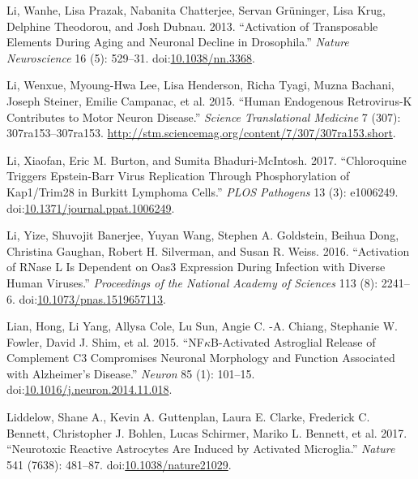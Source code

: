 \documentclass[onehalf,12pt]{beavtex}
\begin{document}
  \hypertarget{ref-LiActivationtransposableelements2013}{}
  Li, Wanhe, Lisa Prazak, Nabanita Chatterjee, Servan Grüninger, Lisa
  Krug, Delphine Theodorou, and Josh Dubnau. 2013. ``Activation of
  Transposable Elements During Aging and Neuronal Decline in Drosophila.''
  \emph{Nature Neuroscience} 16 (5): 529--31.
  doi:\href{https://doi.org/10.1038/nn.3368}{10.1038/nn.3368}.
  
  \hypertarget{ref-LiHumanendogenousretrovirusK2015a}{}
  Li, Wenxue, Myoung-Hwa Lee, Lisa Henderson, Richa Tyagi, Muzna Bachani,
  Joseph Steiner, Emilie Campanac, et al. 2015. ``Human Endogenous
  Retrovirus-K Contributes to Motor Neuron Disease.'' \emph{Science
  Translational Medicine} 7 (307): 307ra153--307ra153.
  \url{http://stm.sciencemag.org/content/7/307/307ra153.short}.
  
  \hypertarget{ref-LiChloroquinetriggersEpsteinBarr2017a}{}
  Li, Xiaofan, Eric M. Burton, and Sumita Bhaduri-McIntosh. 2017.
  ``Chloroquine Triggers Epstein-Barr Virus Replication Through
  Phosphorylation of Kap1/Trim28 in Burkitt Lymphoma Cells.'' \emph{PLOS
  Pathogens} 13 (3): e1006249.
  doi:\href{https://doi.org/10.1371/journal.ppat.1006249}{10.1371/journal.ppat.1006249}.
  
  \hypertarget{ref-LiActivationRNasedependent2016}{}
  Li, Yize, Shuvojit Banerjee, Yuyan Wang, Stephen A. Goldstein, Beihua
  Dong, Christina Gaughan, Robert H. Silverman, and Susan R. Weiss. 2016.
  ``Activation of RNase L Is Dependent on Oas3 Expression During Infection
  with Diverse Human Viruses.'' \emph{Proceedings of the National Academy
  of Sciences} 113 (8): 2241--6.
  doi:\href{https://doi.org/10.1073/pnas.1519657113}{10.1073/pnas.1519657113}.
  
  \hypertarget{ref-LianNFkBActivatedAstroglialRelease2015}{}
  Lian, Hong, Li Yang, Allysa Cole, Lu Sun, Angie C. -A. Chiang, Stephanie
  W. Fowler, David J. Shim, et al. 2015. ``NF\(\kappa\)B-Activated
  Astroglial Release of Complement C3 Compromises Neuronal Morphology and
  Function Associated with Alzheimer's Disease.'' \emph{Neuron} 85 (1):
  101--15.
  doi:\href{https://doi.org/10.1016/j.neuron.2014.11.018}{10.1016/j.neuron.2014.11.018}.
  
  \hypertarget{ref-LiddelowNeurotoxicreactiveastrocytes2017}{}
  Liddelow, Shane A., Kevin A. Guttenplan, Laura E. Clarke, Frederick C.
  Bennett, Christopher J. Bohlen, Lucas Schirmer, Mariko L. Bennett, et
  al. 2017. ``Neurotoxic Reactive Astrocytes Are Induced by Activated
  Microglia.'' \emph{Nature} 541 (7638): 481--87.
  doi:\href{https://doi.org/10.1038/nature21029}{10.1038/nature21029}.
  
\end{document}
